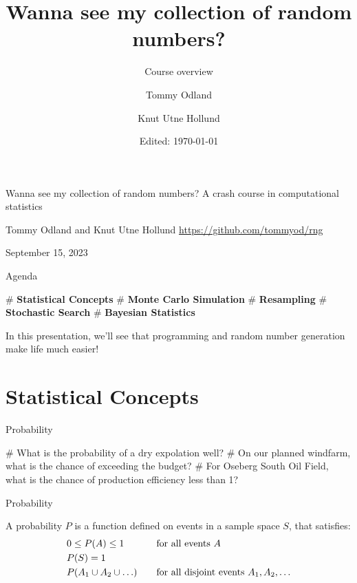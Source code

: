 \documentclass[12pt, aspectratio=149]{beamer}
\institute{Equinor}
\date{Edited: \today}
\author{Tommy Odland \and Knut Utne Hollund}
\title{Wanna see my collection of random numbers?}
\subtitle{Course overview}
\theoremstyle{plain}
\begin{document}
\begin{frame}{}
	\begin{center}
			\vfill
	{\huge Wanna see my collection of random numbers?}
	\vfill
	{\large A crash course in computational statistics}
	\vfill

	\vfill
	{\large  Tommy Odland and Knut Utne Hollund}
	\vfill
	{\small \href{https://github.com/tommyod/rng}{https://github.com/tommyod/rng}}

	\vfill
	September 15, 2023
	\vfill
	\end{center}
\end{frame}

\begin{frame}[fragile]{Agenda}
	
	\begin{easylist}[itemize]
		# \textbf{Statistical Concepts} 
		# \textbf{Monte Carlo Simulation}
		# \textbf{Resampling}
		# \textbf{Stochastic Search} 
		# \textbf{Bayesian Statistics} 
	\end{easylist}
	\hspace{4em}

	In this presentation, we'll see that programming and random number generation make life much easier!
\end{frame}


\section{Statistical Concepts}

\begin{frame}[fragile]{Probability}
	
	\begin{easylist}[itemize]
		# What is the probability of a dry expolation well?
		# On our planned windfarm, what is the chance of exceeding the budget?
		# For Oseberg South Oil Field, what is the chance of production efficiency less than 1?
	\end{easylist}
\end{frame}

\begin{frame}[fragile]{Probability}

	A probability $P$ is a function defined on events in a sample space $S$, that satisfies:
	\begin{align*}
		& 0 \leq P(A) \leq 1  & & \text{for all events $A$} \\
		& P(S) = 1 & & \\
		& P(A_{1} \cup A_{2} \cup \ldots) & \hspace*{1em} & \text{for all disjoint events $A_{1}, A_{2}, \ldots$}	
	\end{align*}  
	
\end{frame}
\end{document}
